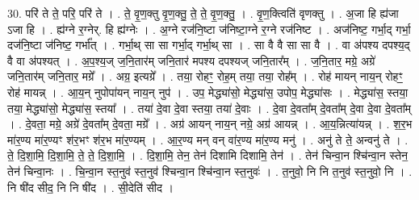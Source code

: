 \documentclass[17pt]{extarticle}
\begin{document}
30. परि॑ ते ते॒ परि॒ परि॑ ते । . ते॒ वृ॒ण॒क्तु वृ॒ण॒क्तु॒ ते॒ ते॒ वृ॒ण॒क्तु॒ । . वृ॒ण॒क्त्विति॑ वृणक्तु । . अ॒जा हि ह्य॑जा ऽजा हि । . ह्य॑ग्ने र॒ग्नेर्. हि ह्य॑ग्नेः । . अ॒ग्ने रज॑नि॒ष्टा ज॑निष्टा॒ग्ने र॒ग्ने रज॑निष्ट । . अज॑निष्ट॒ गर्भा॒द् गर्भा॒ दज॑नि॒ष्टा ज॑निष्ट॒ गर्भा᳚त् । . गर्भा॒थ् सा सा गर्भा॒द् गर्भा॒थ् सा । . सा वै वै सा सा वै । . वा अ॑पश्य दपश्य॒द् वै वा अ॑पश्यत् । . अ॒प॒श्य॒ज् ज॒नि॒तार॑म् जनि॒तार॑ मपश्य दपश्यज् जनि॒तार᳚म् । . ज॒नि॒तार॒ मग्रे॒ अग्रे॑ जनि॒तार॑म् जनि॒तार॒ मग्रे᳚ । . अग्र॒ इत्यग्रे᳚ । . तया॒ रोहꣳ॒॒ रोह॒म् तया॒ तया॒ रोह᳚म् । . रोह॑ मायन् नाय॒न् रोहꣳ॒॒ रोह॑ मायन्न् । . आ॒य॒न् नुपोपा॑यन् नाय॒न् नुप॑ । . उप॒ मेद्ध्या॑सो॒ मेद्ध्या॑स॒ उपोप॒ मेद्ध्या॑सः । . मेद्ध्या॑स॒ स्तया॒ तया॒ मेद्ध्या॑सो॒ मेद्ध्या॑स॒ स्तया᳚ । . तया॑ दे॒वा दे॒वा स्तया॒ तया॑ दे॒वाः । . दे॒वा दे॒वता᳚म् दे॒वता᳚म् दे॒वा दे॒वा दे॒वता᳚म् । . दे॒वता॒ मग्रे॒ अग्रे॑ दे॒वता᳚म् दे॒वता॒ मग्रे᳚ । . अग्र॑ आयन् नाय॒न् नग्रे॒ अग्र॑ आयन्न् । . आ॒य॒न्नित्या॑यन्न् । . श॒र॒भ मा॑र॒ण्य मा॑र॒ण्यꣳ श॑र॒भꣳ श॑र॒भ मा॑र॒ण्यम् । . आ॒र॒ण्य मन् वन् वा॑र॒ण्य मा॑र॒ण्य मनु॑ । . अनु॑ ते ते॒ अन्वनु॑ ते । . ते॒ दि॒शा॒मि॒ दि॒शा॒मि॒ ते॒ ते॒ दि॒शा॒मि॒ । . दि॒शा॒मि॒ तेन॒ तेन॑ दिशामि दिशामि॒ तेन॑ । . तेन॑ चिन्वा॒न श्चि॑न्वा॒न स्तेन॒ तेन॑ चिन्वा॒नः । . चि॒न्वा॒न स्त॒नुव॑ स्त॒नुव॑ श्चिन्वा॒न श्चि॑न्वा॒न स्त॒नुवः॑ । . त॒नुवो॒ नि नि त॒नुव॑ स्त॒नुवो॒ नि । . नि षी॑द सीद॒ नि नि षी॑द । . सी॒देति॑ सीद । \newline
\end{document}
